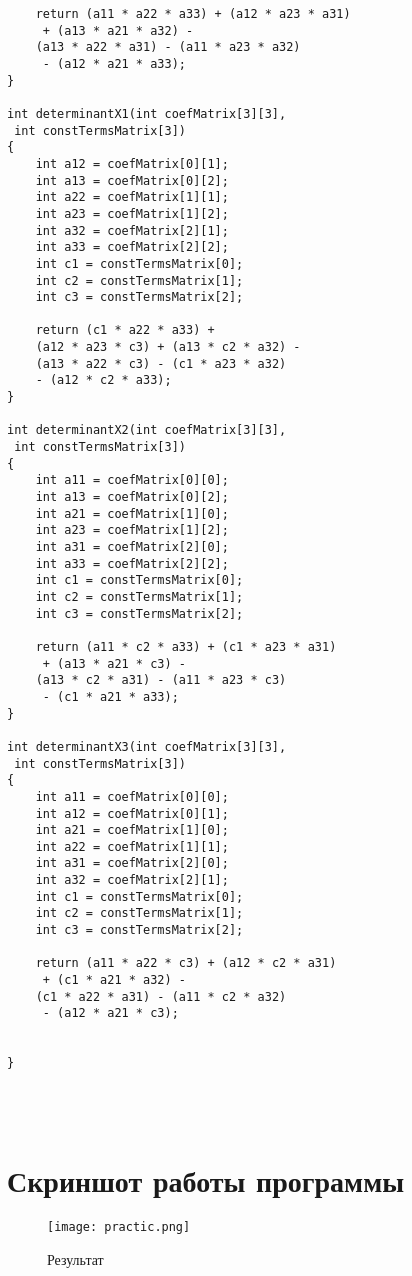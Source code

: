 \documentclass[12pt,a4paper]{scrartcl}
\begin{document}
\begin{verbatim}
	return (a11 * a22 * a33) + (a12 * a23 * a31)
	 + (a13 * a21 * a32) -
	(a13 * a22 * a31) - (a11 * a23 * a32)
	 - (a12 * a21 * a33);
}

int determinantX1(int coefMatrix[3][3],
 int constTermsMatrix[3])
{
	int a12 = coefMatrix[0][1];
	int a13 = coefMatrix[0][2];
	int a22 = coefMatrix[1][1];
	int a23 = coefMatrix[1][2];
	int a32 = coefMatrix[2][1];
	int a33 = coefMatrix[2][2];
	int c1 = constTermsMatrix[0];
	int c2 = constTermsMatrix[1];
	int c3 = constTermsMatrix[2];
	
	return (c1 * a22 * a33) + 
	(a12 * a23 * c3) + (a13 * c2 * a32) -
	(a13 * a22 * c3) - (c1 * a23 * a32) 
	- (a12 * c2 * a33);
}

int determinantX2(int coefMatrix[3][3],
 int constTermsMatrix[3])
{
	int a11 = coefMatrix[0][0];
	int a13 = coefMatrix[0][2];
	int a21 = coefMatrix[1][0];
	int a23 = coefMatrix[1][2];
	int a31 = coefMatrix[2][0];
	int a33 = coefMatrix[2][2];
	int c1 = constTermsMatrix[0];
	int c2 = constTermsMatrix[1];
	int c3 = constTermsMatrix[2];
	
	return (a11 * c2 * a33) + (c1 * a23 * a31)
	 + (a13 * a21 * c3) -
	(a13 * c2 * a31) - (a11 * a23 * c3)
	 - (c1 * a21 * a33);
}

int determinantX3(int coefMatrix[3][3],
 int constTermsMatrix[3])
{
	int a11 = coefMatrix[0][0];
	int a12 = coefMatrix[0][1];
	int a21 = coefMatrix[1][0];
	int a22 = coefMatrix[1][1];
	int a31 = coefMatrix[2][0];
	int a32 = coefMatrix[2][1];
	int c1 = constTermsMatrix[0];
	int c2 = constTermsMatrix[1];
	int c3 = constTermsMatrix[2];
	
	return (a11 * a22 * c3) + (a12 * c2 * a31)
	 + (c1 * a21 * a32) -
	(c1 * a22 * a31) - (a11 * c2 * a32)
	 - (a12 * a21 * c3);
	 
	 
}
	
	
	
\end{verbatim}
\vfill


\section{Скриншот работы программы}
\label{sec:picexample}
\begin{figure}[h]
	\centering
	\texttt{[image: practic.png]}
	\caption{Результат}\label{fig:par}
\end{figure}
\end{document}
